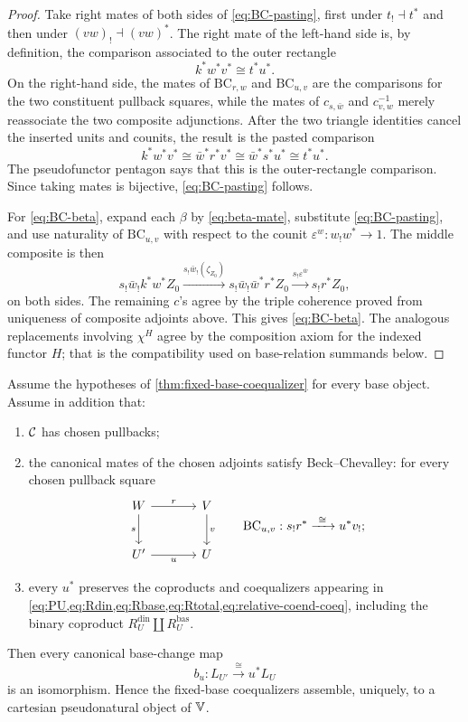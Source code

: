 \begin{proof}
Take right mates of both sides of \cref{eq:BC-pasting}, first under
\(t_!\dashv t^*\) and then under \((vw)_!\dashv(vw)^*\).  The right mate of
the left-hand side is, by definition, the comparison associated to the
outer rectangle
\[
  k^*w^*v^*\cong t^*u^*.
\]
On the right-hand side, the mates of
\(\mathrm{BC}_{r,w}\) and \(\mathrm{BC}_{u,v}\) are the comparisons for
the two constituent pullback squares, while the mates of
\(c_{s,\bar w}\) and \(c^{-1}_{v,w}\) merely reassociate the two composite
adjunctions.  After the two triangle identities cancel the inserted units
and counits, the result is the pasted comparison
\[
  k^*w^*v^*
  \cong\bar w^*r^*v^*
  \cong\bar w^*s^*u^*
  \cong t^*u^*.
\]
The pseudofunctor pentagon says that this is the outer-rectangle comparison.
Since taking mates is bijective, \cref{eq:BC-pasting} follows.

For \cref{eq:BC-beta}, expand each \(\beta\) by
\cref{eq:beta-mate}, substitute \cref{eq:BC-pasting}, and use naturality of
\(\mathrm{BC}_{u,v}\) with respect to the counit
\(\varepsilon^w:w_!w^*\to1\).  The middle composite is then
\[
  s_!\bar w_!k^*w^*Z_0
  \xrightarrow{s_!\bar w_!(\zeta_{Z_0})}
  s_!\bar w_!\bar w^*r^*Z_0
  \xrightarrow{s_!\varepsilon^{\bar w}}s_!r^*Z_0,
\]
on both sides.  The remaining \(c\)'s agree by the triple coherence proved
from uniqueness of composite adjoints above.  This gives
\cref{eq:BC-beta}.  The analogous replacements involving \(\chi^H\) agree
by the composition axiom for the indexed functor \(H\); that is the
compatibility used on base-relation summands below.
\end{proof}

\begin{theorem}
\label{thm:stable-pullback}
Assume the hypotheses of \cref{thm:fixed-base-coequalizer} for every base
object.  Assume in addition that:
\begin{enumerate}[label=(S\arabic*)]
  \item \(\mathcal{C}\) has chosen pullbacks;
  \item the canonical mates of the chosen adjoints satisfy
  Beck--Chevalley: for every chosen
  pullback square
  \begin{equation}
  \begin{tikzcd}[column sep=3.6em,row sep=2.4em]
    W \arrow[r,"r"] \arrow[d,"s"'] & V \arrow[d,"v"]\\
    U' \arrow[r,"u"'] & U
  \end{tikzcd}
  \qquad
  \mathrm{BC}_{u,v}:s_!r^*\xrightarrow{\ \cong\ }u^*v_!;
  \label{eq:BC-square}
  \end{equation}
  \item every \(u^*\) preserves the coproducts and coequalizers appearing in
        \cref{eq:PU,eq:Rdin,eq:Rbase,eq:Rtotal,eq:relative-coend-coeq},
        including the binary coproduct
        \(R_U^{\mathrm{din}}\amalg R_U^{\mathrm{bas}}\).
\end{enumerate}
Then every canonical base-change map
\[
  b_u:L_{U'}\xrightarrow{\ \cong\ }u^*L_U
\]
is an isomorphism.  Hence the fixed-base coequalizers assemble, uniquely, to
a cartesian pseudonatural object of \(\mathbb{V}\).
\end{theorem}

